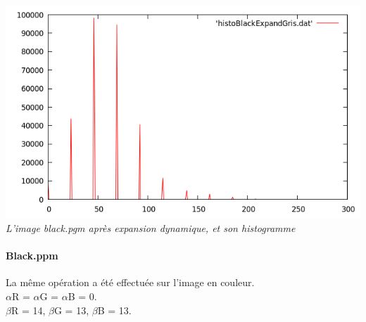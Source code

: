 \documentclass[a4paper,11pt]{article}
\begin{document}
\begin{center}
\includegraphics[scale=0.5]{histoBackExpandGris.png}\\
\textit{L'image black.pgm après expansion dynamique, et son histogramme}
\end{center}

\paragraph{Black.ppm} La même opération a été effectuée sur l'image en couleur.\\
$\alpha$R = $\alpha$G = $\alpha$B = 0.\\
$\beta$R = 14, $\beta$G = 13, $\beta$B = 13.
\end{document}

